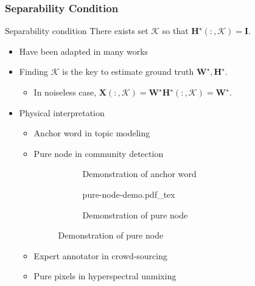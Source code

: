 \documentclass[10pt,xcolor={usenames,dvipsnames,table}]{beamer}
\def\red{\color{red}}
\def\blue{\color{blue}}
\newcommand{\citep}[1]{{\blue \scriptsize \parencite{#1}}}
\newcommand{\citepb}[1]{{\scriptsize \parencite{#1}}}
\begin{document}
\begin{frame}
\frametitle{Separability Condition}
\begin{block}{Separability condition \citepb{donoho2003does}}
    There exists set $\mathcal{K}$ so that $\bm{H}^{\star}(:, \mathcal{K}) = \bm{I}$. 
\end{block}
\begin{itemize}
    \item Have been adapted in many works \citep{chan2011simplex,nascimento2005vertex,arora2016computing,gillis2014fast} 
    \item Finding $\mathcal{K}$ is the key to estimate ground truth $\bm{W}^{\star}, \bm{H}^{\star}$.
    \begin{itemize}
        \item In noiseless case, $\bm{X}(:, \mathcal{K}) = \bm{W}^{\star} \bm{H}^{\star}(:, \mathcal{K}) = \bm{W}^{\star}$.
    \end{itemize}
    \item Physical interpretation
\begin{itemize}
    \item Anchor word \citep{arora2012learning} in topic modeling
    \item Pure node \citep{mao2017mixed} in community detection
\begin{figure}[ht]
    \centering
    \begin{subfigure}[b]{0.55\textwidth}
    \centering
    \caption*{Demonstration of anchor word}
    \end{subfigure}
    \begin{subfigure}[b]{0.30\textwidth}
    \centering
    { \fontsize{7pt}{9pt}\selectfont%
    \def\svgwidth{\columnwidth}
    {pure-node-demo.pdf_tex} }
    \caption*{Demonstration of pure node}
    \end{subfigure}
\end{figure}
    \item Expert annotator in crowd-sourcing \citep{ibrahim2019crowdsourcing}
    \item Pure pixels in hyperspectral unmixing \citep{ma2014asignal}
\end{itemize}
\end{itemize}

\end{frame}
\end{document}
